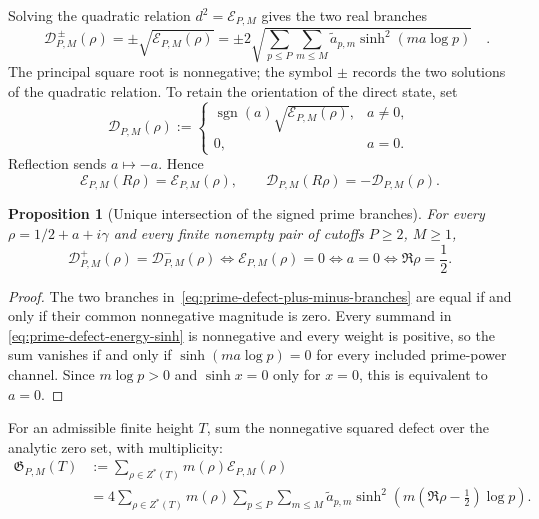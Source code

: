 \documentclass[11pt]{amsart}
\newtheorem{proposition}[theorem]{Proposition}
\theoremstyle{definition}
\theoremstyle{remark}
\begin{document}
Solving the quadratic relation $d^2=\mathcal E_{P,M}$ gives the two real branches
\begin{equation}\label{eq:prime-defect-plus-minus-branches}
 \boxed{\quad
 \mathcal D^{\,\pm}_{P,M}(\rho)
 =\pm\sqrt{\mathcal E_{P,M}(\rho)}
 =\pm2\sqrt{\sum_{p\le P}\sum_{m\le M}
 \widetilde a_{p,m}\sinh^2(ma\log p)}\quad}.
\end{equation}
The principal square root is nonnegative; the symbol $\pm$ records the two
solutions of the quadratic relation.  To retain the orientation of the direct
state, set
\begin{equation}\label{eq:oriented-prime-defect}
 \mathcal D_{P,M}(\rho)
 :=\begin{cases}
 \operatorname{sgn}(a)\sqrt{\mathcal E_{P,M}(\rho)},&a\ne0,\\
 0,&a=0.
 \end{cases}
\end{equation}
Reflection sends $a\mapsto-a$.  Hence
\begin{equation}\label{eq:prime-defect-reflection-parity}
 \mathcal E_{P,M}(R\rho)=\mathcal E_{P,M}(\rho),
 \qquad
 \mathcal D_{P,M}(R\rho)=-\mathcal D_{P,M}(\rho).
\end{equation}

\begin{proposition}[Unique intersection of the signed prime branches]
\label{prop:prime-defect-unique-intersection}
For every $\rho=1/2+a+i\gamma$ and every finite nonempty pair of cutoffs
$P\ge2$, $M\ge1$,
\begin{equation}\label{eq:prime-defect-zero-chain}
 \boxed{\quad
 \mathcal D^{+}_{P,M}(\rho)=\mathcal D^{-}_{P,M}(\rho)
 \iff \mathcal E_{P,M}(\rho)=0
 \iff a=0
 \iff \Re\rho=\frac12.\quad}
\end{equation}
\end{proposition}
\begin{proof}
The two branches in~\eqref{eq:prime-defect-plus-minus-branches} are equal if and
only if their common nonnegative magnitude is zero.  Every summand in
\eqref{eq:prime-defect-energy-sinh} is nonnegative and every weight is positive,
so the sum vanishes if and only if $\sinh(ma\log p)=0$ for every included
prime-power channel.  Since $m\log p>0$ and $\sinh x=0$ only for $x=0$, this is
equivalent to $a=0$.
\end{proof}

For an admissible finite height $T$, sum the nonnegative squared defect over the
analytic zero set, with multiplicity:
\begin{align}\label{eq:global-summed-prime-defect}
 \mathfrak G_{P,M}(T)
 &:=\sum_{\rho\in Z^*(T)}m(\rho)\mathcal E_{P,M}(\rho)\\
 &=4\sum_{\rho\in Z^*(T)}m(\rho)
 \sum_{p\le P}\sum_{m\le M}\widetilde a_{p,m}
 \sinh^2\!\left(m(\Re\rho-\tfrac12)\log p\right).
\end{align}
\end{document}
